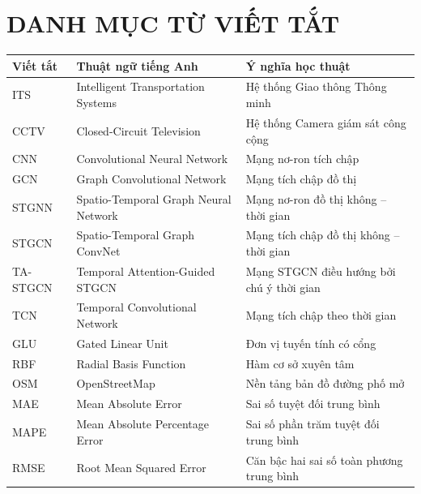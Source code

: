 \documentclass[12pt,a4paper,oneside]{report}
\begin{document}
\newpage
\tableofcontents

\newpage
\listoftables
{}

\newpage
\listoffigures
{}

\newpage
\chapter*{DANH MỤC TỪ VIẾT TẮT}

\begin{table}[H]
\centering
\begin{tabularx}{\textwidth}{l p{4.5cm} X}
\toprule
\textbf{Viết tắt} & \textbf{Thuật ngữ tiếng Anh} & \textbf{Ý nghĩa học thuật} \\
\midrule
ITS & Intelligent Transportation Systems & Hệ thống Giao thông Thông minh \\
CCTV & Closed-Circuit Television & Hệ thống Camera giám sát công cộng \\
CNN & Convolutional Neural Network & Mạng nơ-ron tích chập \\
GCN & Graph Convolutional Network & Mạng tích chập đồ thị \\
STGNN & Spatio-Temporal Graph Neural Network & Mạng nơ-ron đồ thị không -- thời gian \\
STGCN & Spatio-Temporal Graph ConvNet & Mạng tích chập đồ thị không -- thời gian \\
TA-STGCN & Temporal Attention-Guided STGCN & Mạng STGCN điều hướng bởi chú ý thời gian \\
TCN & Temporal Convolutional Network & Mạng tích chập theo thời gian \\
GLU & Gated Linear Unit & Đơn vị tuyến tính có cổng \\
RBF & Radial Basis Function & Hàm cơ sở xuyên tâm \\
OSM & OpenStreetMap & Nền tảng bản đồ đường phố mở \\
MAE & Mean Absolute Error & Sai số tuyệt đối trung bình \\
MAPE & Mean Absolute Percentage Error & Sai số phần trăm tuyệt đối trung bình \\
RMSE & Root Mean Squared Error & Căn bậc hai sai số toàn phương trung bình \\

\end{tabularx}
\end{table}
\end{document}
